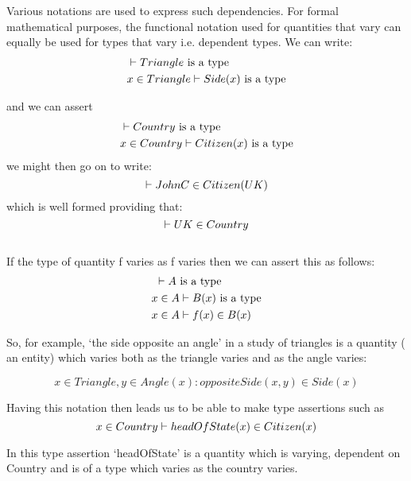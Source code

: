 \documentclass[12pt,a4paper]{article}
\begin{document}
\noindent Various notations are used to express such dependencies. For formal
mathematical purposes, the functional
notation used for quantities that vary can equally be used for types that vary i.e. dependent types. We can write:
\begin{align*}
&\vdash Triangle\mbox{ is a type} \\
&x \in Triangle \vdash Side(x)\mbox{ is a type} 
\end{align*}  

\noindent and we can assert
\begin{align*}
&\vdash Country\mbox{ is a type} \\
&x \in Country \vdash Citizen(x) \mbox{ is a type}
\end{align*}
\noindent we might then go on to write: 
\begin{equation*}
\vdash JohnC \in Citizen(UK)
\end{equation*}
which is well formed providing that:
\begin{equation*}
\vdash UK \in Country
\end{equation*}
\\


\noindent If the type of quantity f varies as f varies then we can assert this as follows: \\
\begin{align*}
&\text{                                  }\vdash A\mbox{ is a type} \\
&x \in A \vdash B(x)\mbox{ is a type} \\
&x \in A \vdash f(x) \in B(x) 
\end{align*}


\noindent So, for example, `the side opposite an angle' in a study of triangles is a quantity ( an entity)  which varies both as the triangle varies and as the angle varies:

\begin{equation*}
x \in Triangle, y \in Angle(x): oppositeSide(x,y) \in Side(x)
\end{equation*}

\noindent Having this notation then leads us to be able to make type assertions such as
\begin{equation*}
x \in Country \vdash headOfState(x) \in Citizen(x)
\end{equation*}

\noindent In this type assertion `headOfState' is a quantity which is varying, dependent on Country and is of a type which varies as the country varies.\\
\end{document}
